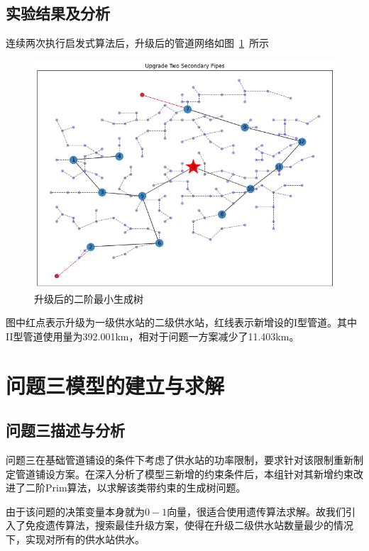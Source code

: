 \documentclass{whutmod}
\begin{document}
        \subsection{实验结果及分析}
        连续两次执行启发式算法后，升级后的管道网络如图~\ref{vwrsshbu}~所示
		  \begin{figure}[H]
			\centering
			\includegraphics[width=\textwidth]{figures/333.png}
			\caption{升级后的二阶最小生成树}\label{vwrsshbu}
		\end{figure}
        图中红点表示升级为一级供水站的二级供水站，红线表示新增设的I型管道。其中II型管道使用量为392.001km，相对于问题一方案减少了11.403km。
	
\newpage
    \section{问题三模型的建立与求解}
   		\subsection{问题三描述与分析}
   		问题三在基础管道铺设的条件下考虑了供水站的功率限制，要求针对该限制重新制定管道铺设方案。在深入分析了模型三新增的约束条件后，本组针对其新增约束改进了二阶Prim算法，以求解该类带约束的生成树问题。
   		
   		由于该问题的决策变量本身就为$0-1$向量，很适合使用遗传算法求解。故我们引入了免疫遗传算法，搜索最佳升级方案，使得在升级二级供水站数量最少的情况下，实现对所有的供水站供水。
\end{document}
